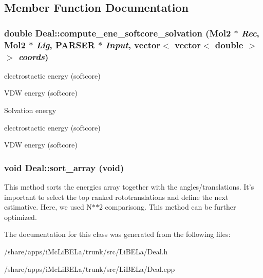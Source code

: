 \subsection{Member Function Documentation}
\hypertarget{classDeal_a413250a08bd09f48c746b046f2fe832f}{
\subsubsection[{compute\_\-ene\_\-softcore\_\-solvation}]{\setlength{\rightskip}{0pt plus 5cm}double Deal::compute\_\-ene\_\-softcore\_\-solvation ({\bf Mol2} $\ast$ {\em Rec}, \/  {\bf Mol2} $\ast$ {\em Lig}, \/  {\bf PARSER} $\ast$ {\em Input}, \/  vector$<$ vector$<$ double $>$ $>$ {\em coords})}}
\label{classDeal_a413250a08bd09f48c746b046f2fe832f}


electrostactic energy (softcore)

VDW energy (softcore)

Solvation energy

electrostactic energy (softcore)

VDW energy (softcore) \hypertarget{classDeal_ab36a3bcdb00eebadca5d8e1b83903afe}{
\subsubsection[{sort\_\-array}]{\setlength{\rightskip}{0pt plus 5cm}void Deal::sort\_\-array (void)}}
\label{classDeal_ab36a3bcdb00eebadca5d8e1b83903afe}
This method sorts the energies array together with the angles/translations. It's important to select the top ranked rototranslations and define the next estimative. Here, we used N$\ast$$\ast$2 comparisong. This method can be further optimized. 

The documentation for this class was generated from the following files:\begin{DoxyCompactItemize}
\item 
/share/apps/iMcLiBELa/trunk/src/LiBELa/Deal.h\item 
/share/apps/iMcLiBELa/trunk/src/LiBELa/Deal.cpp\end{DoxyCompactItemize}
